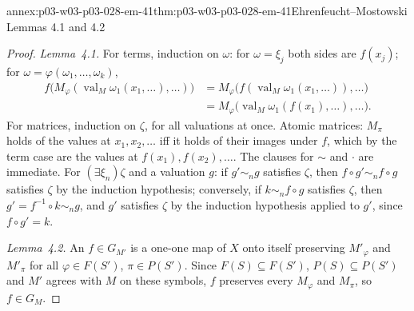 \begin{annexitem}{annex:p03-w03-p03-028-em-41}{thm:p03-w03-p03-028-em-41}{Ehrenfeucht--Mostowski Lemmas 4.1 and 4.2}
\begin{proof}
\emph{Lemma~4.1.}  For terms, induction on \(\omega\): for \(\omega=\xi_j\) both
sides are \(f(x_j)\); for \(\omega=\varphi(\omega_1,\ldots,\omega_k)\),
\begin{align*}
  f\bigl(M_\varphi(\operatorname{val}_M\omega_1(x_1,\ldots),\ldots)\bigr)
  &=M_\varphi\bigl(f(\operatorname{val}_M\omega_1(x_1,\ldots)),\ldots\bigr)\\
  &=M_\varphi\bigl(\operatorname{val}_M\omega_1(f(x_1),\ldots),\ldots\bigr).
\end{align*}
For matrices,
induction on \(\zeta\), for all valuations at once.  Atomic matrices: \(M_\pi\)
holds of the values at \(x_1,x_2,\ldots\) iff it holds of their images under
\(f\), which by the term case are the values at \(f(x_1),f(x_2),\ldots\).  The
clauses for \(\mathord\sim\) and \(\cdot\) are immediate.  For
\((\exists\xi_n)\zeta\) and a valuation \(g\): if \(g'\sim_ng\) satisfies
\(\zeta\), then \(f\circ g'\sim_nf\circ g\) satisfies \(\zeta\) by the induction
hypothesis; conversely, if \(k\sim_nf\circ g\) satisfies \(\zeta\), then
\(g'=f^{-1}\circ k\sim_ng\), and \(g'\) satisfies \(\zeta\) by the induction
hypothesis applied to \(g'\), since \(f\circ g'=k\).

\emph{Lemma~4.2.}  An \(f\in G_{M'}\) is a one-one map of \(X\) onto itself
preserving \(M'_\varphi\) and \(M'_\pi\) for all \(\varphi\in F(S')\),
\(\pi\in P(S')\).  Since \(F(S)\subseteq F(S')\), \(P(S)\subseteq P(S')\) and
\(M'\) agrees with \(M\) on these symbols, \(f\) preserves every \(M_\varphi\)
and \(M_\pi\), so \(f\in G_M\).
\end{proof}
\end{annexitem}

